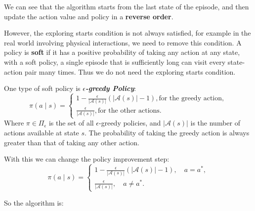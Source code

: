 \documentclass[10pt]{elegantbook}
\newcommand{\mydefination}[1]{\textbf{\textit{\textcolor{structurecolor}{#1}}}}
\begin{document}
\vspace{\baselineskip}

We can see that the algorithm starts from the last state of the episode, and then update the action value and policy in a \textbf{reverse order}.

However, the exploring starts condition is not always satisfied, for example in the real world involving physical interactions, we need to remove this 
condition. A policy is \textbf{soft} if it has a positive probability of taking any action at any state, with a soft policy, a single
episode that is sufficiently long can visit every state-action pair many times. Thus we do not need the exploring starts condition.

One type of soft policy is \mydefination{$\epsilon$-greedy Policy}:
\begin{equation}
    \pi(a \mid s) = \left \{ 
    \begin{array}{l}
        1 - \frac{\epsilon}{|\mathcal A(s)|}(|\mathcal A(s)| - 1), \text{for the greedy action}, \\
        \frac{\epsilon}{|\mathcal A(s)|}, \text{for the other actions}.
    \end{array} \right .
\end{equation}
Where $\pi \in \Pi_{\epsilon}$ is the set of all $\epsilon$-greedy policies, and $|\mathcal A(s)|$ is the number of actions available at state $s$.
The probability of taking the greedy action is always greater than that of taking any other action. 

With this we can change the policy improvement step:
\begin{equation} \label{eq:e_greedy_policy}
    \pi(a \mid s) = \left \{ 
    \begin{array}{l}
        1 - \frac{\epsilon}{|\mathcal A(s)|}(|\mathcal A(s)| - 1), \quad a = a^*, \\
        \frac{\epsilon}{|\mathcal A(s)|}, \quad a \neq a^*.
    \end{array} \right .
\end{equation}

So the algorithm is:
\end{document}
